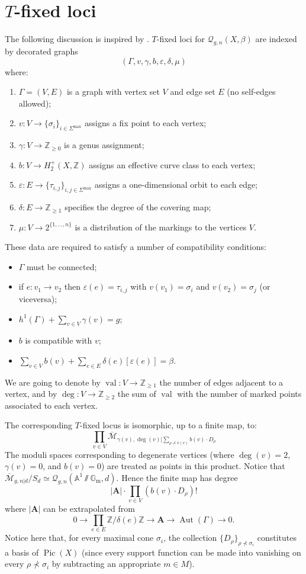 \documentclass[11pt]{amsart}
\newcommand{\Q}[4]{\mathcal{Q}_{#1,#2}(#3,#4)}
\renewcommand{\to}{\rightarrow}
\newcommand{\Aaff}{\mathbb{A}}
\newcommand{\Pic}{\operatorname{Pic}}
\newcommand{\val}{\operatorname{val}}
\newcommand{\Gm}{\mathbb{G}_{\text{m}}}
\newcommand{\ZZ}{\mathbb{Z}}
\newcommand{\Aut}{\operatorname{Aut}}
\theoremstyle{definition}
\theoremstyle{definition}
\begin{document}
\section{$T$-fixed loci}
The following discussion is inspired by \cite[\S 7.3]{MOP}. $T$-fixed loci for $\Q{g}{n}{X}{\beta}$ are indexed by decorated graphs
\[ \left(\Gamma, v, \gamma, b,\varepsilon,\delta,\mu\right) \]
where:
\begin{enumerate}
 \item $\Gamma=(V,E)$ is a graph with vertex set $V$ and edge set $E$ (no self-edges allowed);
 \item $v\colon V\to \{\sigma_i\}_{i\in\Sigma^\text{max}}$ assigns a fix point to each vertex;
 \item $\gamma\colon V\to \ZZ_{\geq 0}$ is a genus assignment;
 \item $b\colon V\to H^+_2(X,\ZZ)$ assigns an effective curve class to each vertex;
 \item $\varepsilon\colon E\to \{\tau_{i,j}\}_{i,j\in\Sigma^\text{max}}$ assigns a one-dimensional orbit to each edge;
 \item $\delta\colon E\to \ZZ_{\geq1}$ specifies the degree of the covering map;
 \item $\mu\colon V\to 2^{\{1,\ldots,n\}}$ is a distribution of the markings to the vertices $V$.
\end{enumerate}
These data are required to satisfy a number of compatibility conditions:
\begin{itemize}
 \item $\Gamma$ must be connected;
 \item if $e\colon v_1\to v_2$ then $\varepsilon(e)=\tau_{i,j}$ with $v(v_1)=\sigma_i$ and $v(v_2)=\sigma_j$ (or viceversa);
 \item $h^1(\Gamma)+\sum_{v\in V} \gamma(v)=g$;
 \item $b$ is compatible with $v$; 
 \item $\sum_{v\in V}b(v)+\sum_{e\in E}\delta(e)[\varepsilon(e)]=\beta$.
 \end{itemize}
We are going to denote by $\val\colon V\to\ZZ_{\geq1}$ the number of edges adjacent to a vertex, and by $\deg\colon V\to\ZZ_{\geq2}$ the sum of $\val$ with the number of marked points associated to each vertex.

The corresponding $T$-fixed locus is isomorphic, up to a finite map, to:
\[
 \prod_{v\in V} \overline{\mathcal M}_{\gamma(v),\deg(v)|\sum_{\rho\nprec v(v)}b(v)\cdot D_\rho}
\]
The moduli spaces corresponding to degenerate vertices (where $\deg(v)=2$, $\gamma(v)=0$, and $b(v)=0$) are treated as points in this product. Notice that $\overline{\mathcal M}_{g,n|d}/S_d\simeq\Q{g}{n}{\Aaff^1\sslash\Gm}{d}$. Hence the finite map has degree \[|\mathbf A|\cdot\prod_{v\in V}(b(v)\cdot D_\rho)!\] where $|\mathbf A|$ can be extrapolated from
\[
 0\to\prod_{e\in E}\ZZ/\delta(e)\ZZ\to \mathbf A\to \Aut(\Gamma)\to 0.
\]
Notice here that, for every maximal cone $\sigma_i$, the collection $\{D_\rho\}_{\rho\nprec\sigma_i}$ constitutes a basis of $\Pic(X)$ (since every support function can be made into vanishing on every $\rho\nprec\sigma_i$ by subtracting an appropriate $m\in M$).
\end{document}
